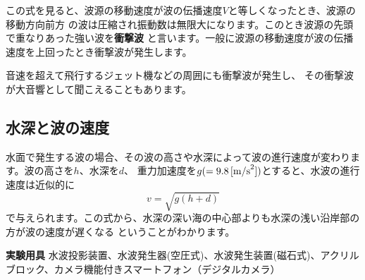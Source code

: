 この式を見ると、波源の移動速度が波の伝播速度$V$と等しくなったとき、波源の移動方向前方
の波は圧縮され振動数は無限大になります。このとき波源の先頭で重なりあった強い波を{\bf 衝撃波}
と言います。一般に波源の移動速度が波の伝播速度を上回ったとき衝撃波が発生します。

音速を超えて飛行するジェット機などの周囲にも衝撃波が発生し、
その衝撃波が大音響として聞こえることもあります。

\subsection{水深と波の速度}

水面で発生する波の場合、その波の高さや水深によって波の進行速度が変わります。波の高さを$h$、水深を$d$、
重力加速度を$g(=9.8\, [{\rm m/s}^2])$とすると、水波の進行速度は近似的に
\[
v = \sqrt{g(h+d)}
\]
で与えられます。この式から、水深の深い海の中心部よりも水深の浅い沿岸部の方が波の速度が遅くなる
ということがわかります。

\newpage

\jikken

\begin{itemsquarebox}[c]{\bf 実験用具}
水波投影装置、水波発生器(空圧式)、水波発生装置(磁石式)、アクリルブロック、カメラ機能付きスマートフォン（デジタルカメラ）
\end{itemsquarebox}

\bigskip


